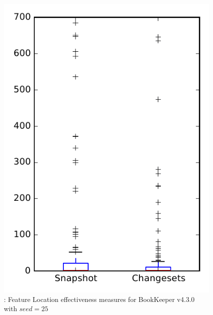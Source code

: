 
\begin{figure}
\centering
\includegraphics[height=0.4\textheight]{figures/flt_seed/rq1_bookkeeper_25}
\caption{\rone: Feature Location effectiveness measures for BookKeeper v4.3.0 with $seed=25$}
\label{fig:flt_seed:rq1:bookkeeper}
\end{figure}
